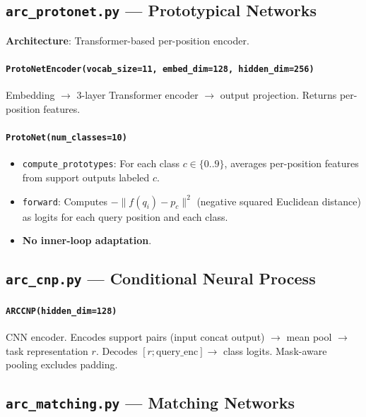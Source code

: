 \documentclass[11pt,a4paper]{article}
\begin{document}
\subsection{\texttt{arc\_protonet.py} --- Prototypical Networks}
\textbf{Architecture}: Transformer-based per-position encoder.

\paragraph{\texttt{ProtoNetEncoder(vocab\_size=11, embed\_dim=128, hidden\_dim=256)}}
Embedding $\to$ 3-layer Transformer encoder $\to$ output projection. Returns per-position features.

\paragraph{\texttt{ProtoNet(num\_classes=10)}}
\begin{itemize}[nosep]
  \item \texttt{compute\_prototypes}: For each class $c \in \{0..9\}$, averages per-position features from support outputs labeled $c$.
  \item \texttt{forward}: Computes $-\|f(q_i) - p_c\|^2$ (negative squared Euclidean distance) as logits for each query position and each class.
  \item \textbf{No inner-loop adaptation}.
\end{itemize}

\subsection{\texttt{arc\_cnp.py} --- Conditional Neural Process}
\paragraph{\texttt{ARCCNP(hidden\_dim=128)}}
CNN encoder. Encodes support pairs (input concat output) $\to$ mean pool $\to$ task representation $r$. Decodes $[r; \text{query\_enc}] \to$ class logits. Mask-aware pooling excludes padding.

\subsection{\texttt{arc\_matching.py} --- Matching Networks}
\end{document}
